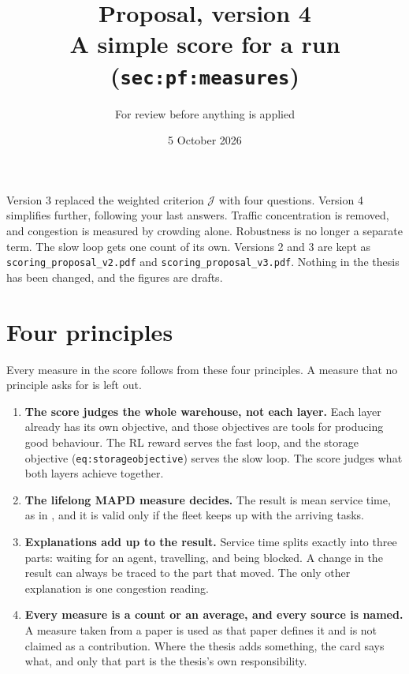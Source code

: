 \documentclass[11pt,a4paper]{article}
\title{Proposal, version 4\\[2pt]\large A simple score for a run (\texttt{sec:pf:measures})}
\author{For review before anything is applied}
\date{5 October 2026}
\begin{document}
\sloppy
\maketitle

\noindent Version 3 replaced the weighted criterion $\mathcal{J}$ with four
questions. Version 4 simplifies further, following your last answers.
Traffic concentration is removed, and congestion is measured by crowding
alone. Robustness is no longer a separate term. The slow loop gets one
count of its own. Versions 2 and 3 are kept as \texttt{scoring\_proposal\_v2.pdf}
and \texttt{scoring\_proposal\_v3.pdf}. Nothing in the thesis has been
changed, and the figures are drafts.

\tableofcontents

\section{Four principles}
\label{sec:principles}

Every measure in the score follows from these four principles. A measure
that no principle asks for is left out.

\begin{enumerate}[leftmargin=1.5em]
  \item \textbf{The score judges the whole warehouse, not each layer.}
    Each layer already has its own objective, and those objectives are
    tools for producing good behaviour. The RL reward serves the fast
    loop, and the storage objective (\texttt{eq:storageobjective}) serves
    the slow loop. The score judges what both layers achieve together.
  \item \textbf{The lifelong MAPD measure decides.} The result is mean
    service time, as in \citet{ma2017lifelong_mapf}, and it is valid only
    if the fleet keeps up with the arriving tasks.
  \item \textbf{Explanations add up to the result.} Service time splits
    exactly into three parts: waiting for an agent, travelling, and being
    blocked. A change in the result can always be traced to the part that
    moved. The only other explanation is one congestion reading.
  \item \textbf{Every measure is a count or an average, and every source
    is named.} A measure taken from a paper is used as that paper defines
    it and is not claimed as a contribution. Where the thesis adds
    something, the card says what, and only that part is the thesis's own
    responsibility.
\end{enumerate}
\end{document}

